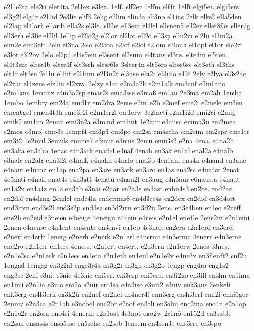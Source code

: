 {e2l1e2ta
ele2ti
elet4ta
2el1ex
e3lex.
1elf.
elf2er
1elfm
elf4r
1elft
elgi5er.
elgi5ers
el3g2l
elg4r
e2l1id
2e3lie
elif3
2elig
e2lim
elin3a
eli3no
el1ins
2elk
elks2
ella5den
el2lap
el4larb
ellar4t
ella2s
el3le.
ell2ei
ell3ein
el4lel
ellenen5
ell2er
eller8fas
eller7g
ell3erh
el3lie
el2lil
1ellip
el2lo2g
el2lor
el2lot
ell2ö
ell3sp
ellu2m
el2lü
el3m2a
elm2e
elm3ein
2eln
el3na
2elo
e2l3oa
e2lof
e2lol
e2lom
e2lonk
el1opf
el1or
elo2ri
e3lot
e3l2ov
2elö
el3p4
el4s5ein
el3sent
el2sum
el4tans
el3te.
elte4m
el5ten.
el4t3ent
elter4b
elter4f
elt3erh
elter6le
3elter4n
elt5ero
elter6sc
elt3eth
el3the
elt1r
elt3se
2e1lu
el1uf
e2l1um
e2l3u2r
el3use
elu2t
el3uto
e1lü
2ely
e2lya
el3z2ac
el2zar
el4zene
elz1in
el2zwa
2elzy
e1m
e2m3a2b
e2m1alk
em3anf
e2m1ano
e2m1ans
1emanz
e4m3a2sp
emas2s
ema3sse
e3maß
em1au
2e3mä
em2äh
1emba
1embo
1embry
em2dä
emd1r
em2dra
2eme
e2m1e2b
e2mef
eme2i
e2mele
em2en
emen6gel
emen4t3h
eme3r2i
e2m1er2l
em1erw
3e2meti
e2m1i2d
emi2ei
e2mig
emik2
em1im
2emin
emi3n2a
e3mind
em1int
1e2mir
e3misc
emma3u
em2mec
e2moa
e3mol
emo3s
1empf4
em3pfl
em3po
em2sa
em4scha
em2sim
em2spr
ems1tr
em3t2
1e2mul
3emuls
emune7
e3mur
e3mus
2emü
emü3s2
e2na
4ena.
e4na2b
en3aba
en3abo
4enac
e4n3ack
enadi4
e4naf
4enah
en3ak
en1al
enal2a
e4nalb
e3nale
en2alg
ena3l2i
e4nalk
e4nalm
e4nalo
enal3p
4en1am
ena4n
e4nand
en3ane
e4nant
e4nanz
en1ap
ena2pa
en3are
en3ark
en3aro
en1as
ena2sc
e4na4st
2enat
4e5nati
e4natl
enat4s
e4n3att
4enatu
e4nau2f
en3aug
e4n3aur
e6nausta
e4naut
en1a2x
en1a4z
en1ä
en3äb
e3näi
e2när
en2ä3s
en3äst
enbu4s3
en2ce.
end2ac
en2dal
en4dang
2endel
ende4lä
endermas8
en4d3es4s
en2dex
en2did
en3d4ort
end3rom
end3s2l
end3s2p
end3sz
en3d2um
en3d2ü
2ene.
en3e4ben
en1ec
e2neff
ene2h
en2eid
e3neien
e4neige
4eneigu
e4nein
e4neis
e2n1el
ene4le
2ene2m
e2n1emi
2enen
e4nense
e4n1ent
en4entr
en3envi
en1ep
4e3ner.
en2era
e2n1erd
en3erei
e2nerf
en4erfr
1energ
e2nerh
e2nerk
e2n1erl
e4nermi
e4n3ermo
4enern
e4n3erne
ene2ro
e2n1err
en1ers
4eners.
e2n1ert
en4ert.
e2n3eru
e2n1erw
2enes
e3nes.
e2n1e2sc
e2n1esk
e2n1ess
en1eta
e2n1eth
en1eul
e2n1e2v
e4ne2x
en3f
enft2
enf2u
1engad
1engag
en3g2al
enge3r4a
en3g2i
en3gn
en3g2o
1engp
eng4ra
eng1s2
eng3se
2eni
e3ni.
e3nic
4e3nie
eni3er.
eni3erp
eni5ers.
en3i2ko
en3ill
eni4m
en1ima
en1imi
e2n1in
e3nio
eni2ö
e2nir
eni4sa
e4n3iso
e3nit2
e3niv
enk3aus
3enkeli
enk3erg
en4k3erk
en3k2ü
en2nef
en2nel
en4ner4f
enn3erg
en4n3erl
enn2i
enni6ger
2enniv
e2n3oa
e2n1ob
e3nobel
eno2br
e2nof
en3oli
en3olm
eno2ma
eno4n
e2n1op
e2n1o2r
en2ora
eno4ri
4enorm
e2n1ost
4e3not
eno2w
2e1nö
en1ö2d
en3sabb
en2san
ensas4s
ensa5sse
en5sche
en2seb
1ensem
en4sen3e
ens3ere
en3spo
}
